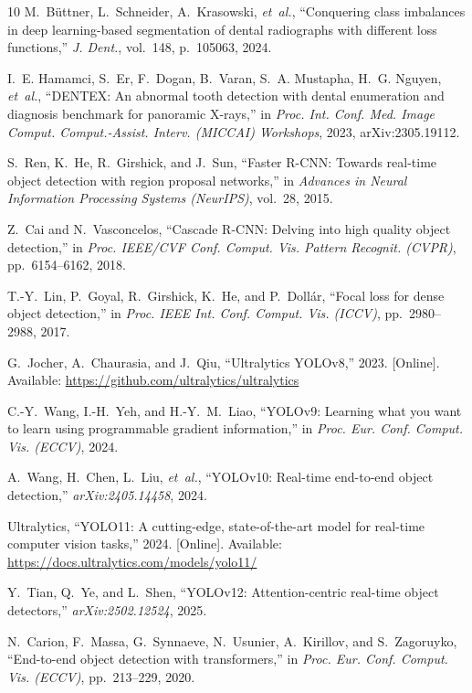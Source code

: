\documentclass[10pt,journal,compsoc]{IEEEtran}
\begin{document}
\begin{thebibliography}{10}
M.~B{\"u}ttner, L.~Schneider, A.~Krasowski, \textit{et~al.}, ``Conquering class imbalances in deep learning-based segmentation of dental radiographs with different loss functions,'' \textit{J. Dent.}, vol.~148, p.~105063, 2024.

I.~E. Hamamci, S.~Er, F.~Dogan, B.~Varan, S.~A. Mustapha, H.~G. Nguyen, \textit{et~al.}, ``DENTEX: An abnormal tooth detection with dental enumeration and diagnosis benchmark for panoramic X-rays,'' in \textit{Proc. Int. Conf. Med. Image Comput. Comput.-Assist. Interv. (MICCAI) Workshops}, 2023, arXiv:2305.19112.

S.~Ren, K.~He, R.~Girshick, and J.~Sun, ``Faster R-CNN: Towards real-time object detection with region proposal networks,'' in \textit{Advances in Neural Information Processing Systems (NeurIPS)}, vol.~28, 2015.

Z.~Cai and N.~Vasconcelos, ``Cascade R-CNN: Delving into high quality object detection,'' in \textit{Proc. IEEE/CVF Conf. Comput. Vis. Pattern Recognit. (CVPR)}, pp.~6154--6162, 2018.

T.-Y.~Lin, P.~Goyal, R.~Girshick, K.~He, and P.~Doll{\'a}r, ``Focal loss for dense object detection,'' in \textit{Proc. IEEE Int. Conf. Comput. Vis. (ICCV)}, pp.~2980--2988, 2017.

G.~Jocher, A.~Chaurasia, and J.~Qiu, ``Ultralytics YOLOv8,'' 2023. [Online]. Available: \url{https://github.com/ultralytics/ultralytics}

C.-Y.~Wang, I.-H.~Yeh, and H.-Y.~M.~Liao, ``YOLOv9: Learning what you want to learn using programmable gradient information,'' in \textit{Proc. Eur. Conf. Comput. Vis. (ECCV)}, 2024.

A.~Wang, H.~Chen, L.~Liu, \textit{et~al.}, ``YOLOv10: Real-time end-to-end object detection,'' \textit{arXiv:2405.14458}, 2024.

Ultralytics, ``YOLO11: A cutting-edge, state-of-the-art model for real-time computer vision tasks,'' 2024. [Online]. Available: \url{https://docs.ultralytics.com/models/yolo11/}

Y.~Tian, Q.~Ye, and L.~Shen, ``YOLOv12: Attention-centric real-time object detectors,'' \textit{arXiv:2502.12524}, 2025.

N.~Carion, F.~Massa, G.~Synnaeve, N.~Usunier, A.~Kirillov, and S.~Zagoruyko, ``End-to-end object detection with transformers,'' in \textit{Proc. Eur. Conf. Comput. Vis. (ECCV)}, pp.~213--229, 2020.


\end{thebibliography}
\end{document}

